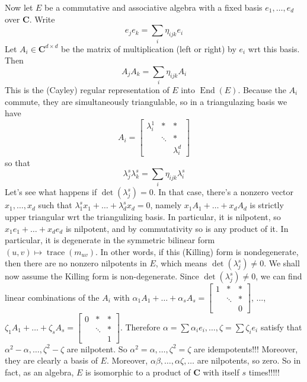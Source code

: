 \documentclass[english]{article}
\def\C{\mathbf{C}}
\DeclareMathOperator\End{End}
\DeclareMathOperator\trace{trace}
\begin{document}
Now let $E$ be a commutative and associative algebra with a fixed basis $e_1,\dots,e_d$ over $\C$. Write $$e_je_k=\sum_i \eta_{ijk}e_i$$
Let $A_i\in\C^{d\times d}$ be the matrix of multiplication (left or right) by $e_i$ wrt this basis. Then $$A_jA_k=\sum_i\eta_{ijk}A_i$$ 
This is the (Cayley) regular representation of $E$ into $\End(E)$. Because the $A_i$ commute, they are simultaneously triangulable, so in a triangulazing basis we have $$A_i=\left[\begin{array}{ccc}
\lambda_{i}^{1} & * & *\\
 & \ddots & *\\
 &  & \lambda_{i}^{d}
\end{array}\right]$$
so that $$\lambda_{j}^s\lambda_k^s=\sum_i \eta_{ijk}\lambda_i^s$$
Let's see what happens if $\det(\lambda_j^s)=0$. In that case, there's a nonzero vector $x_1,\dots,x_d$ such that $\lambda_1^sx_1+\dots+\lambda_d^sx_d=0$, namely $x_1A_1+\dots+x_dA_d$ is strictly upper triangular wrt the triangulizing basis. In particular, it is nilpotent, so $x_1e_1+\dots+x_de_d$ is nilpotent, and by commutativity so is any product of it. In particular, it is degenerate in the symmetric bilinear form $(u,v)\mapsto \trace(m_{uv})$. In other words, if this (Killing) form is nondegenerate, then there are no nonzero nilpotents in $E$, which means $\det(\lambda_j^s)\neq 0$. We shall now assume the Killing form is non-degenerate. Since $\det(\lambda_j^s)\neq 0$, we can find linear combinations of the $A_i$ with $\alpha_{1}A_{1}+\dots+\alpha_{s}A_{s}=\left[\begin{array}{ccc}
1 & * & *\\
 & \ddots & *\\
 &  & 0
\end{array}\right]$, ..., $\zeta_{1}A_{1}+\dots+\zeta_{s}A_{s}=\left[\begin{array}{ccc}
0 & * & *\\
 & \ddots & *\\
 &  & 1
\end{array}\right]$. Therefore $\alpha=\sum \alpha_i e_i,\dots,\zeta=\sum \zeta_i e_i$ satisfy that $\alpha^2-\alpha,\dots,\zeta^2-\zeta$ are nilpotent. So $\alpha^2=\alpha,\dots,\zeta^2=\zeta$ are idempotents!!! Moreover, they are clearly a basis of $E$. Moreover, $\alpha\beta,\dots,\alpha\zeta,\dots$ are nilpotents, so zero. So in fact, as an algebra, $E$ is isomorphic to a product of $\C$ with itself $s$ times!!!!!
\\\\
\end{document}
